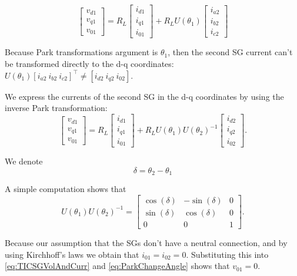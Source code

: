 \documentclass[conference]{IEEEtran}
\newcommand{\BE}{\begin{equation}}
\newcommand{\BEQ}[1]{\BE\label{#1}} %
\begin{document}
$$
\left[\begin{array}{c}
v_{d1}\\
v_{q1}\\
v_{01}
\end{array}\right]=R_{L}\left[\begin{array}{c}
i_{d1}\\
i_{q1}\\
i_{01}
\end{array}\right]+R_{L}U(\theta_{1})\left[\begin{array}{c}
i_{a2}\\
i_{b2}\\
i_{c2}
\end{array}\right]
$$

Because Park transformations argument is  $\theta_1$, then the second SG current can't be transformed directly to the d-q coordinates:   $U(\theta_{1})\left[ i_{a2}\ i_{b2}\ i_{c2}\right]^\top \neq \left[ i_{d2}\ i_{q2}\ i_{02}\right]$. 

We express  the currents of the second SG in the d-q coordinates by using the inverse Park transformation: 
\BEQ{eq:TICSGVolAndCurr}
 \left[\begin{array}{c}
v_{d1}\\
v_{q1}\\
v_{01}
\end{array}\right]=R_{L}\left[\begin{array}{c}
i_{d1}\\
i_{q1}\\
i_{01}
\end{array}\right]+R_{L}U(\theta_{1})U(\theta_{2})^{-1}\left[\begin{array}{c}
i_{d2}\\
i_{q2}\\
i_{02}
\end{array}\right].
\end{equation}

We denote $$\delta=\theta_{2}-\theta_{1}$$

A simple computation shows that 
\BEQ{eq:ParkChangeAngle}
  U(\theta_{1})U(\theta_{2})^{-1}=\left[\begin{array}{ccc}
\cos(\delta) & -\sin(\delta) & 0\\
\sin(\delta) & \cos(\delta) & 0\\
0 & 0 & 1
\end{array}\right].
\end{equation}

Because our assumption that the SGs don't have a neutral connection, and by using Kirchhoff's laws we obtain that $i_{01}=i_{02}=0$.  Substituting this into \eqref{eq:TICSGVolAndCurr} and \eqref{eq:ParkChangeAngle} shows that $v_{01} = 0$.
\end{document}
